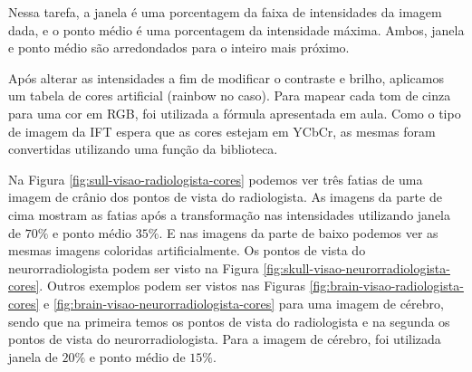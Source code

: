 \documentclass{article}
\begin{document}
Nessa tarefa, a janela é uma porcentagem da faixa de intensidades da imagem dada, e o ponto médio é uma porcentagem da intensidade máxima. Ambos, janela e ponto médio são arredondados para o inteiro mais próximo.
 
Após alterar as intensidades a fim de modificar o contraste e brilho, aplicamos um tabela de cores artificial (rainbow no caso). Para mapear cada tom de cinza para uma cor em RGB, foi utilizada a fórmula apresentada em aula. Como o tipo de imagem da IFT espera que as cores estejam em YCbCr, as mesmas foram convertidas utilizando uma função da biblioteca.
 
Na Figura \ref{fig:sull-visao-radiologista-cores} podemos ver três fatias de uma imagem de crânio dos pontos de vista do radiologista. As imagens da parte de cima mostram as fatias após a transformação nas intensidades utilizando janela de $70\%$ e ponto médio $35\%$. E nas imagens da parte de baixo podemos ver as mesmas imagens coloridas artificialmente. Os pontos de vista do neurorradiologista podem ser visto na Figura \ref{fig:skull-visao-neurorradiologista-cores}. Outros exemplos podem ser vistos nas Figuras \ref{fig:brain-visao-radiologista-cores} e \ref{fig:brain-visao-neurorradiologista-cores} para uma imagem de cérebro, sendo que na primeira temos os pontos de vista do radiologista e na segunda os pontos de vista do neurorradiologista. Para a imagem de cérebro, foi utilizada janela de $20\%$ e ponto médio de $15\%$.
\end{document}
